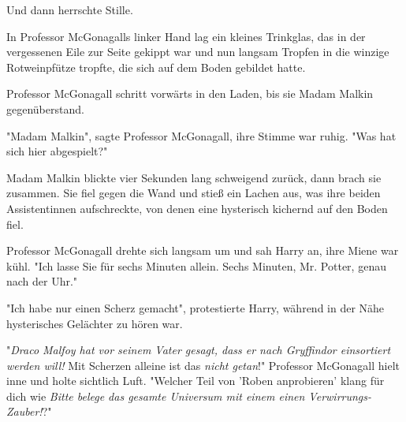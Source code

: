 Und dann herrschte Stille. 

In Professor McGonagalls linker Hand lag ein kleines Trinkglas, das in der vergessenen Eile zur Seite gekippt war und nun langsam Tropfen in die winzige Rotweinpfütze tropfte, die sich auf dem Boden gebildet hatte.

Professor McGonagall schritt vorwärts in den Laden, bis sie Madam Malkin gegenüberstand.

"Madam Malkin", sagte Professor McGonagall, ihre Stimme war ruhig. "Was hat sich hier abgespielt?" 

Madam Malkin blickte vier Sekunden lang schweigend zurück, dann brach sie zusammen. Sie fiel gegen die Wand und stieß ein Lachen aus, was ihre beiden Assistentinnen aufschreckte, von denen eine hysterisch kichernd auf den Boden fiel.

Professor McGonagall drehte sich langsam um und sah Harry an, ihre Miene war kühl. "Ich lasse Sie für sechs Minuten allein. Sechs Minuten, Mr. Potter, genau nach der Uhr." 

"Ich habe nur einen Scherz gemacht", protestierte Harry, während in der Nähe hysterisches Gelächter zu hören war. 

"\emph{Draco Malfoy hat vor seinem Vater gesagt, dass er nach Gryffindor einsortiert werden will!} Mit Scherzen alleine ist das \emph{nicht getan}!" Professor McGonagall hielt inne und holte sichtlich Luft. "Welcher Teil von 'Roben anprobieren' klang für dich wie \emph{Bitte belege das gesamte Universum mit einem einen Verwirrungs-Zauber!}?" 



